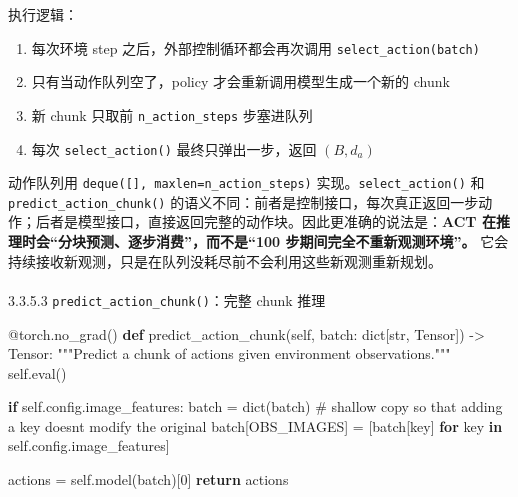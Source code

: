 \documentclass[
  chinese,
]{ctexart}
\makeatletter
\let\oldparagraph\paragraph
\renewcommand{\paragraph}{
    \@ifstar
      \xxxParagraphStar
      \xxxParagraphNoStar
  }
\newcommand{\xxxParagraphStar}[1]{\oldparagraph*{#1}\mbox{}}
\newcommand{\xxxParagraphNoStar}[1]{\oldparagraph{#1}\mbox{}}
\newenvironment{Shaded}{\begin{snugshade}}{\end{snugshade}}
\newcommand{\AttributeTok}[1]{\textcolor[rgb]{0.40,0.45,0.13}{#1}}
\newcommand{\BuiltInTok}[1]{\textcolor[rgb]{0.00,0.23,0.31}{#1}}
\newcommand{\CommentTok}[1]{\textcolor[rgb]{0.37,0.37,0.37}{#1}}
\newcommand{\ControlFlowTok}[1]{\textcolor[rgb]{0.00,0.23,0.31}{\textbf{#1}}}
\newcommand{\DecValTok}[1]{\textcolor[rgb]{0.68,0.00,0.00}{#1}}
\newcommand{\KeywordTok}[1]{\textcolor[rgb]{0.00,0.23,0.31}{\textbf{#1}}}
\newcommand{\NormalTok}[1]{\textcolor[rgb]{0.00,0.23,0.31}{#1}}
\newcommand{\OperatorTok}[1]{\textcolor[rgb]{0.37,0.37,0.37}{#1}}
\newcommand{\VariableTok}[1]{\textcolor[rgb]{0.07,0.07,0.07}{#1}}
\providecommand{\tightlist}{%
  \setlength{\itemsep}{0pt}\setlength{\parskip}{0pt}}
\makeatother
\begin{document}
执行逻辑：

\begin{enumerate}
\def\labelenumi{\arabic{enumi}.}
\tightlist
\item
  每次环境 step 之后，外部控制循环都会再次调用
  \texttt{select\_action(batch)}
\item
  只有当动作队列空了，policy 才会重新调用模型生成一个新的 chunk
\item
  新 chunk 只取前 \texttt{n\_action\_steps} 步塞进队列
\item
  每次 \texttt{select\_action()} 最终只弹出一步，返回 \((B, d_a)\)
\end{enumerate}

动作队列用 \texttt{deque({[}{]},\ maxlen=n\_action\_steps)}
实现。\texttt{select\_action()} 和 \texttt{predict\_action\_chunk()}
的语义不同：前者是控制接口，每次真正返回一步动作；后者是模型接口，直接返回完整的动作块。因此更准确的说法是：\textbf{ACT
在推理时会``分块预测、逐步消费''，而不是``100
步期间完全不重新观测环境''。}
它会持续接收新观测，只是在队列没耗尽前不会利用这些新观测重新规划。

\paragraph{\texorpdfstring{3.3.5.3
\texttt{predict\_action\_chunk()}：完整 chunk
推理}{3.3.5.3 predict\_action\_chunk()：完整 chunk 推理}}\label{predict_action_chunkux5b8cux6574-chunk-ux63a8ux7406}

\begin{Shaded}
\begin{Highlighting}[]
    \AttributeTok{@torch.no\_grad}\NormalTok{()}
    \KeywordTok{def}\NormalTok{ predict\_action\_chunk(}\VariableTok{self}\NormalTok{, batch: }\BuiltInTok{dict}\NormalTok{[}\BuiltInTok{str}\NormalTok{, Tensor]) }\OperatorTok{{-}\textgreater{}}\NormalTok{ Tensor:}
        \CommentTok{"""Predict a chunk of actions given environment observations."""}
        \VariableTok{self}\NormalTok{.}\BuiltInTok{eval}\NormalTok{()}

        \ControlFlowTok{if} \VariableTok{self}\NormalTok{.config.image\_features:}
\NormalTok{            batch }\OperatorTok{=} \BuiltInTok{dict}\NormalTok{(batch)  }\CommentTok{\# shallow copy so that adding a key doesn\textquotesingle{}t modify the original}
\NormalTok{            batch[OBS\_IMAGES] }\OperatorTok{=}\NormalTok{ [batch[key] }\ControlFlowTok{for}\NormalTok{ key }\KeywordTok{in} \VariableTok{self}\NormalTok{.config.image\_features]}

\NormalTok{        actions }\OperatorTok{=} \VariableTok{self}\NormalTok{.model(batch)[}\DecValTok{0}\NormalTok{]}
        \ControlFlowTok{return}\NormalTok{ actions}
\end{Highlighting}
\end{Shaded}
\end{document}
